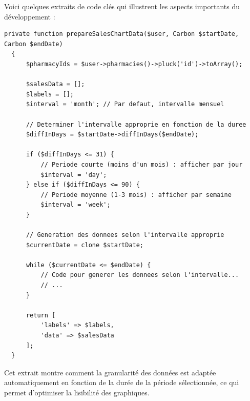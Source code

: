 \documentclass[a4paper,12pt]{report}
\begin{document}
  Voici quelques extraits de code clés qui illustrent les aspects importants du développement :
  
  \begin{lstlisting}[caption=Méthode prepareSalesChartData dans DashboardController.php]
  private function prepareSalesChartData($user, Carbon $startDate, Carbon $endDate)
  {
      $pharmacyIds = $user->pharmacies()->pluck('id')->toArray();
      
      $salesData = [];
      $labels = [];
      $interval = 'month'; // Par defaut, intervalle mensuel
      
      // Determiner l'intervalle approprie en fonction de la duree
      $diffInDays = $startDate->diffInDays($endDate);
      
      if ($diffInDays <= 31) {
          // Periode courte (moins d'un mois) : afficher par jour
          $interval = 'day';
      } else if ($diffInDays <= 90) {
          // Periode moyenne (1-3 mois) : afficher par semaine
          $interval = 'week';
      }
      
      // Generation des donnees selon l'intervalle approprie
      $currentDate = clone $startDate;
      
      while ($currentDate <= $endDate) {
          // Code pour generer les donnees selon l'intervalle...
          // ...
      }
      
      return [
          'labels' => $labels,
          'data' => $salesData
      ];
  }
  \end{lstlisting}
  
  Cet extrait montre comment la granularité des données est adaptée automatiquement en fonction de la durée de la période sélectionnée, ce qui permet d'optimiser la lisibilité des graphiques.
  
\end{document}
